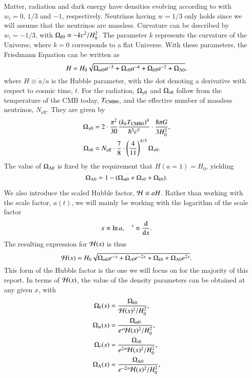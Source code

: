 Matter, radiation and dark energy have densities evolving according to  with $w_i=0,\,1/3$ and $-1$, respectively. Neutrinos having $w=1/3$ only holds since we will assume that the neutrinos are massless. Curvature can be described by $w_i=-1/3$, with $\Omega_{k0}\equiv -kc^2/H_0^2$. The parameter $k$ represents the curvature of the Universe, where $k=0$ corresponds to a flat Universe. With these parameters, the Friedmann Equation can be written as \cite[Eq. (3.14)]{Dodelson}  
\begin{equation}
    H = H_0 \sqrt{\Omega_{m0} a^{-3} + \Omega_{r0} a^{-4} + \Omega_{k0} a^{-2} + \Omega_{\Lambda 0}}, \label{eq:M1:theory:Friedmann_H_omegas}
\end{equation}
where $H\equiv\dot{a}/a$ is the Hubble parameter, with the dot denoting a derivative with respect to cosmic time, $t$. For the radiation, $\Omega_{\gamma 0}$ and $\Omega_{\nu 0}$ follow from the temperature of the CMB today, $T_\mathrm{CMB0}$, and the effective number of massless neutrinos, $N_\mathrm{eff}$. They are given by 
\begin{align}
    \Omega_{\gamma 0} &= 2 \cdot \frac{\pi^2}{30} \frac{(k_b T_\mathrm{CMB0})^4}{\hbar^3 c^5} \cdot \frac{8\pi G}{3H_0^2}, \label{eq:M1:theory:omega_gamma0_T} \\
    \Omega_{\nu 0} &= N_\mathrm{eff} \cdot \frac{7}{8} \cdot \left( \frac{4}{11} \right)^{4/3} \Omega_{\gamma 0}. \label{eq:M1:theory:omega_nu0_T}
\end{align}
%
%
The value of $\Omega_{\Lambda 0}$ is fixed by the requirement that $H(a=1)=H_0$, yielding 
\begin{equation}
    \Omega_{\Lambda 0} = 1 - (\Omega_{m0} + \Omega_{r0} + \Omega_{k0}). \label{eq:M1:theory:omega_lambda_0_normalization_condition}
\end{equation}
%

We also introduce the scaled Hubble factor, $\mathcal{H}\equiv aH$. Rather than working with the scale factor, $a(t)$, we will mainly be working with the logarithm of the scale factor 
\begin{equation} \label{eq:M1:theory:x_dx_definitions}
    x\equiv \ln a,\quad '\equiv \dv{x}. 
\end{equation}
%
The resulting expression for $\mathcal{H}(x)$ is thus  
\begin{equation} \label{eq:M1:theory:Hp_of_x}
    \mathcal{H}(x) = H_0 \sqrt{\Omega_{m0} e^{-x} + \Omega_{r0} e^{-2x} + \Omega_{k0} + \Omega_{\Lambda 0} e^{2x}}. 
\end{equation}
%
This form of the Hubble factor is the one we will focus on for the majority of this report. In terms of $\mathcal{H}(x)$, the value of the density parameters can be obtained at any given $x$, with 
\begin{align}
    \Omega_{k}(x) &= \frac{\Omega_{k0}}{\mathcal{H}(x)^2 / H_0^2}, \label{eq:M1:theory:omega_k_of_x}\\ 
    \Omega_{m}(x) &= \frac{\Omega_{m0}}{e^x \mathcal{H}(x)^2 / H_0^2}, \label{eq:M1:theory:omega_m_of_x}\\ 
    \Omega_{r}(x) &= \frac{\Omega_{r0}}{e^{2x} \mathcal{H}(x)^2 / H_0^2}, \label{eq:M1:theory:omega_r_of_x}\\ 
    \Omega_{\Lambda}(x) &= \frac{\Omega_{\Lambda 0}}{e^{-2x} \mathcal{H}(x)^2 / H_0^2}, \label{eq:M1:theory:omega_L_of_x}    
\end{align}

